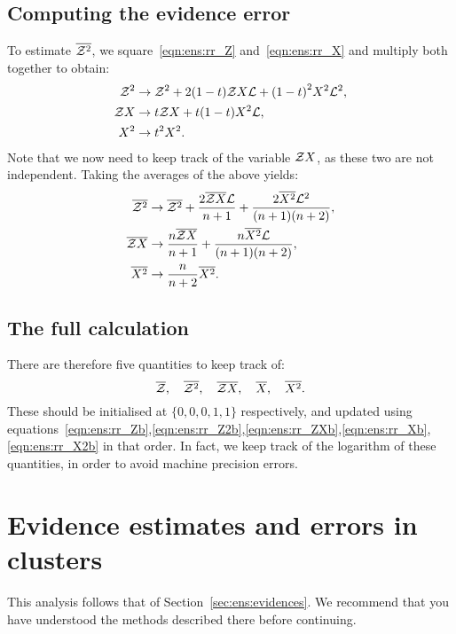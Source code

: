 \subsection{Computing the evidence error}
\label{sec:ens:basic_error}
To estimate $\overline{\mathcal{Z}^2}$, we square~\eqref{eqn:ens:rr_Z} and~\eqref{eqn:ens:rr_X} and multiply both together to obtain:
%
\begin{align}
  \mathcal{Z}^2 &\to \mathcal{Z}^2 + 2(1-t)\mathcal{Z} X\mathcal{L} +  {(1-t)}^2X^2\mathcal{L} ^2,
  \label{eqn:ens:rr_Z2b}
  \\
  \mathcal{Z} X &\to t\mathcal{Z} X + t(1-t)X^2\mathcal{L},
  \label{eqn:ens:rr_ZXb}
  \\
  X^2 &\to t^2X^2.
  \label{eqn:ens:rr_X2b}
\end{align}
%
Note that we now need to keep track of the variable $\mathcal{Z} X$, as these two are not independent.
Taking the averages of the above yields:
\begin{align}
  \overline{\mathcal{Z}^2} &\to \overline{\mathcal{Z}^2} + \frac{2\overline{\mathcal{Z} X}\mathcal{L}}{n+1} +  \frac{2\overline{X^2}\mathcal{L}^2}{(n+1)(n+2)},
  \\
  \overline{\mathcal{Z} X} &\to \frac{n\overline{\mathcal{Z} X}}{n+1} + \frac{n\overline{X^2}\mathcal{L}}{(n+1)(n+2)},
  \\
  \overline{X^2} &\to \frac{n}{n+2}\overline{X^2}.
\end{align}

\subsection{The full calculation}
\label{sec:ens:basic_full}

There are therefore five quantities to keep track of: 
\[ \overline{\mathcal{Z}},\quad\overline{\mathcal{Z}^2},\quad\overline{\mathcal{Z} X},\quad \overline{X},\quad\overline{X^2}.\]
These should be initialised at $\{0,0,0,1,1\}$ respectively, and updated using equations~\eqref{eqn:ens:rr_Zb},\ref{eqn:ens:rr_Z2b},\ref{eqn:ens:rr_ZXb},\ref{eqn:ens:rr_Xb},\ref{eqn:ens:rr_X2b} in that order. In fact, we keep track of the logarithm of these quantities, in order to avoid machine precision errors.





\section{Evidence estimates and errors in clusters}
\label{sec:ens:evidences_clusters}
This analysis follows that of Section~\ref{sec:ens:evidences}. We recommend that you have understood the methods described there before continuing.


